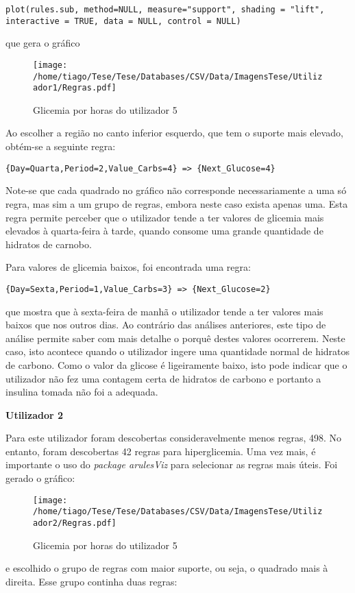 \begin{lstlisting}
plot(rules.sub, method=NULL, measure="support", shading = "lift", interactive = TRUE, data = NULL, control = NULL)
\end{lstlisting}
que gera o gráfico

\begin{figure}[H]
\centering
\texttt{[image: /home/tiago/Tese/Tese/Databases/CSV/Data/ImagensTese/Utilizador1/Regras.pdf]}
\caption{Glicemia por horas do utilizador 5}
\end{figure}
Ao escolher a região no canto inferior esquerdo, que tem o suporte mais elevado, obtém-se a seguinte regra:

\begin{lstlisting}
{Day=Quarta,Period=2,Value_Carbs=4} => {Next_Glucose=4}

\end{lstlisting}
Note-se que cada quadrado no gráfico não corresponde necessariamente a uma só regra, mas sim a um grupo de regras, embora neste caso exista apenas uma. Esta regra permite perceber que o utilizador tende a ter valores de glicemia mais elevados à quarta-feira à tarde, quando consome uma grande quantidade de hidratos de carnobo.

Para valores de glicemia baixos, foi encontrada uma regra:

\begin{lstlisting}
{Day=Sexta,Period=1,Value_Carbs=3} => {Next_Glucose=2}
\end{lstlisting}
que mostra que à sexta-feira de manhã o utilizador tende a ter valores mais baixos que nos outros dias. Ao contrário das análises anteriores, este tipo de análise permite saber com mais detalhe o porquê destes valores ocorrerem. Neste caso, isto acontece quando o utilizador ingere uma quantidade normal de hidratos de carbono. Como o valor da glicose é ligeiramente baixo, isto pode indicar que o utilizador não fez uma contagem certa de hidratos de carbono e portanto a insulina tomada não foi a adequada.


\textbf{Utilizador 2}

Para este utilizador foram descobertas consideravelmente menos regras, 498. No entanto, foram descobertas 42 regras para hiperglicemia. Uma vez mais, é importante o uso do \textit{package arulesViz} para selecionar as regras mais úteis. Foi gerado o gráfico:


\begin{figure}[H]
\centering
\texttt{[image: /home/tiago/Tese/Tese/Databases/CSV/Data/ImagensTese/Utilizador2/Regras.pdf]}
\caption{Glicemia por horas do utilizador 5}
\end{figure}
e escolhido o grupo de regras com maior suporte, ou seja, o quadrado mais à direita. Esse grupo continha duas regras:

